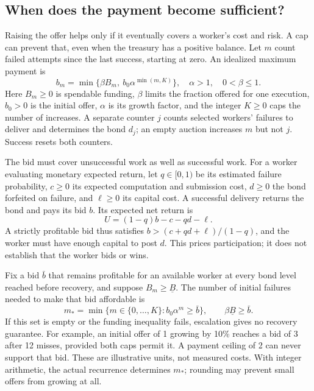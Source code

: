 \documentclass[10pt,letterpaper]{article}
\begin{document}
\subsection{When does the payment become sufficient?}
Raising the offer helps only if it eventually covers a worker's cost and risk. A cap can prevent that, even when the treasury has a positive balance. Let $m$ count failed attempts since the last success, starting at zero. An idealized maximum payment is
\begin{equation}
 b_m=\min\{\beta B_m,\ b_0\alpha^{\min(m,K)}\},
 \quad \alpha>1,\quad 0<\beta\leq1. \label{eq:bounty}
\end{equation}
Here $B_m\geq0$ is spendable funding, $\beta$ limits the fraction offered for one execution, $b_0>0$ is the initial offer, $\alpha$ is its growth factor, and the integer $K\geq0$ caps the number of increases. A separate counter $j$ counts selected workers' failures to deliver and determines the bond $d_j$; an empty auction increases $m$ but not $j$. Success resets both counters.

The bid must cover unsuccessful work as well as successful work. For a worker evaluating monetary expected return, let $q\in[0,1)$ be its estimated failure probability, $c\geq0$ its expected computation and submission cost, $d\geq0$ the bond forfeited on failure, and $\ell\geq0$ its capital cost. A successful delivery returns the bond and pays its bid $b$. Its expected net return is
\begin{equation}
 U=(1-q)b-c-qd-\ell.
 \label{eq:utility}
\end{equation}
A strictly profitable bid thus satisfies $b>(c+qd+\ell)/(1-q)$, and the worker must have enough capital to post $d$. This prices participation; it does not establish that the worker bids or wins.

Fix a bid $\bar b$ that remains profitable for an available worker at every bond level reached before recovery, and suppose $B_m\geq\underline B$. The number of initial failures needed to make that bid affordable is
\begin{equation}
 m_* = \min\{m\in\{0,\ldots,K\}: b_0\alpha^m\geq\bar b\},
 \qquad \beta\underline B\geq\bar b.
 \label{eq:threshold}
\end{equation}
If this set is empty or the funding inequality fails, escalation gives no recovery guarantee. For example, an initial offer of 1 growing by 10\% reaches a bid of 3 after 12 misses, provided both caps permit it. A payment ceiling of 2 can never support that bid. These are illustrative units, not measured costs. With integer arithmetic, the actual recurrence determines $m_*$; rounding may prevent small offers from growing at all.
\end{document}

